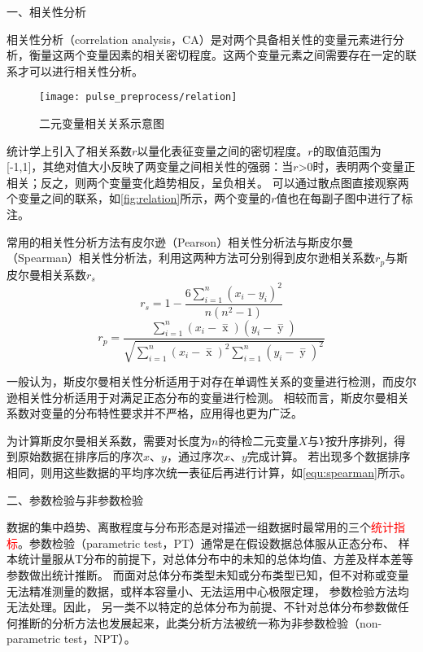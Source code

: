 一、相关性分析

相关性分析（correlation analysis，CA）是对两个具备相关性的变量元素进行分析，衡量这两个变量因素的相关密切程度\cite{Zhang2019}。这两个变量元素之间需要存在一定的联系才可以进行相关性分析。

\begin{figure}[htbp]
    \centering
    \texttt{[image: pulse\_preprocess/relation]}
    \caption[二元变量相关关系示意图]{\label{fig:relation}二元变量相关关系示意图\cite{IXL2022}}
\end{figure}

统计学上引入了相关系数$r$以量化表征变量之间的密切程度。$r$的取值范围为[-1,1]，其绝对值大小反映了两变量之间相关性的强弱：当$r$>0时，表明两个变量正相关；反之，则两个变量变化趋势相反，呈负相关。
可以通过散点图直接观察两个变量之间的联系，如\autoref{fig:relation}所示，两个变量的$r$值也在每副子图中进行了标注。

常用的相关性分析方法有皮尔逊（Pearson）相关性分析法与斯皮尔曼（Spearman）相关性分析法，利用这两种方法可分别得到皮尔逊相关系数$r_p$与斯皮尔曼相关系数$r_s$
\begin{equation}
    \label{equ:spearman}
    r_s=1-\frac{6\sum_{i=1}^{n}(x_{i}-y_{i})^2}{n(n^2-1)}
\end{equation}
\begin{equation}
    \label{equ:pearson}
    r_p=\frac{\sum_{i=1}^n{(x_i- \mathop{x} \limits^-)(y_i- \mathop{y} \limits^-)}}{\sqrt{{\sum_{i=1}^n}{{(x_i- \mathop{x} \limits^-)^2\sum_{i=1}^n}{(y_i- \mathop{y} \limits^-)^2}}}}
\end{equation}

一般认为，斯皮尔曼相关性分析适用于对存在单调性关系的变量进行检测，而皮尔逊相关性分析适用于对满足正态分布的变量进行检测。
相较而言，斯皮尔曼相关系数对变量的分布特性要求并不严格，应用得也更为广泛。

为计算斯皮尔曼相关系数，需要对长度为$n$的待检二元变量$X$与$Y$按升序排列，得到原始数据在排序后的序次$x$、$y$，通过序次$x$、$y$完成计算。
若出现多个数据排序相同，则用这些数据的平均序次统一表征后再进行计算，如\autoref{equ:spearman}所示。

二、参数检验与非参数检验

数据的集中趋势、离散程度与分布形态是对描述一组数据时最常用的三个\textcolor{red}{统计指标}。参数检验（parametric test，PT）通常是在假设数据总体服从正态分布、
样本统计量服从T分布的前提下，对总体分布中的未知的总体均值、方差及样本差等参数做出统计推断。
而面对总体分布类型未知或分布类型已知，但不对称或变量无法精准测量的数据，或样本容量小、无法运用中心极限定理，
参数检验方法均无法处理。因此，
另一类不以特定的总体分布为前提、不针对总体分布参数做任何推断的分析方法也发展起来，此类分析方法被统一称为非参数检验（non-parametric test，NPT）\cite{Guo2017,Zhang2019}。

